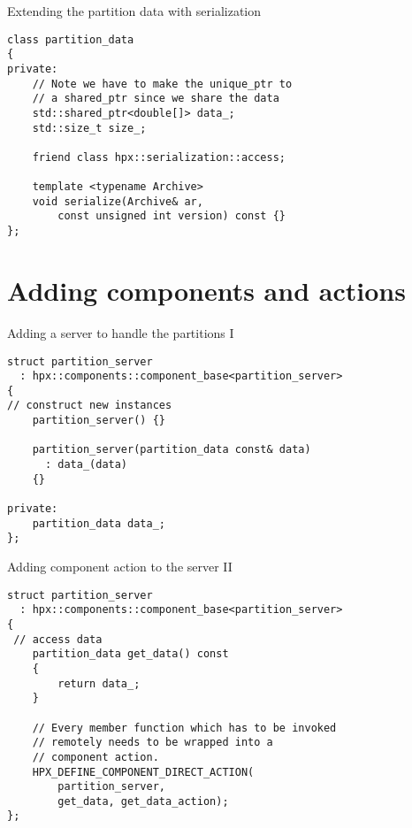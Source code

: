 \documentclass[\classoption]{beamer}
\begin{document}
\begin{frame}[fragile]{Extending the partition data with serialization}
\begin{lstlisting}
class partition_data
{
private:
    // Note we have to make the unique_ptr to 
    // a shared_ptr since we share the data
    std::shared_ptr<double[]> data_;
    std::size_t size_;

    friend class hpx::serialization::access;

    template <typename Archive>
    void serialize(Archive& ar, 
        const unsigned int version) const {}
};
\end{lstlisting}

\end{frame}


\section{Adding components and actions}

\begin{frame}[fragile]{Adding a server to handle the partitions I}

\begin{lstlisting}
struct partition_server
  : hpx::components::component_base<partition_server>
{
// construct new instances
    partition_server() {}

    partition_server(partition_data const& data)
      : data_(data)
    {}
    
private:
    partition_data data_;
};
\end{lstlisting}

\end{frame}

\begin{frame}[fragile]{Adding component action to the server II}

\begin{lstlisting}
struct partition_server
  : hpx::components::component_base<partition_server>
{
 // access data
    partition_data get_data() const
    {
        return data_;
    }

    // Every member function which has to be invoked 
    // remotely needs to be wrapped into a 
    // component action.
    HPX_DEFINE_COMPONENT_DIRECT_ACTION(
        partition_server, 
        get_data, get_data_action);
};
\end{lstlisting}

\end{frame}
\end{document}
